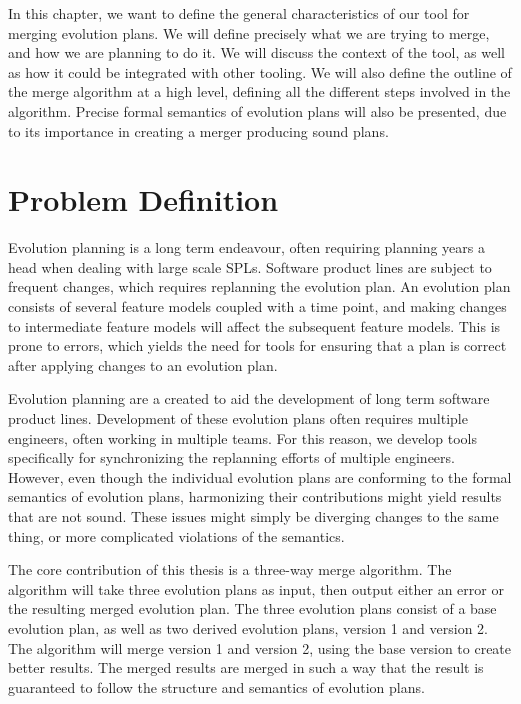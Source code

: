 \documentclass[a4paper,english]{ifimaster}
\begin{document}
In this chapter, we want to define the general characteristics of our tool for merging evolution plans. We will define precisely what we are trying to merge, and how we are planning to do it. We will discuss the context of the tool, as well as how it could be integrated with other tooling. We will also define the outline of the merge algorithm at a high level, defining all the different steps involved in the algorithm. Precise formal semantics of evolution plans will also be presented, due to its importance in creating a merger producing sound plans.

\section{Problem Definition}%
\label{sec:problem_defintion}

Evolution planning is a long term endeavour, often requiring planning years a head when dealing with large scale SPLs. Software product lines are subject to frequent changes, which requires replanning the evolution plan. An evolution plan consists of several feature models coupled with a time point, and making changes to intermediate feature models will affect the subsequent feature models. This is prone to errors, which yields the need for tools for ensuring that a plan is correct after applying changes to an evolution plan.

Evolution planning are a created to aid the development of long term software product lines. Development of these evolution plans often requires multiple engineers, often working in multiple teams. For this reason, we develop tools specifically for synchronizing the replanning efforts of multiple engineers. However, even though the individual evolution plans are conforming to the formal semantics of evolution plans, harmonizing their contributions might yield results that are not sound. These issues might simply be diverging changes to the same thing, or more complicated violations of the semantics.

The core contribution of this thesis is a three-way merge algorithm. The algorithm will take three evolution plans as input, then output either an error or the resulting merged evolution plan. The three evolution plans consist of a base evolution plan, as well as two derived evolution plans, version 1 and version 2. The algorithm will merge version 1 and version 2, using the base version to create better results. The merged results are merged in such a way that the result is guaranteed to follow the structure and semantics of evolution plans.
\end{document}
